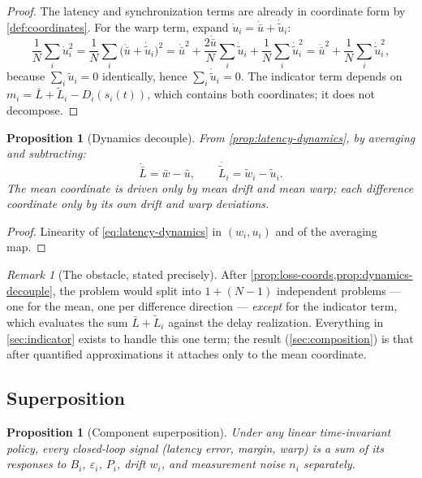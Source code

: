 \documentclass[11pt, a4paper]{article}
\theoremstyle{definition}
\theoremstyle{plain}
\newtheorem{proposition}[theorem]{Proposition}
\theoremstyle{remark}
\newtheorem{remark}{Remark}[section]
\newcommand{\Lbar}{\bar{L}}
\newcommand{\Ltil}[1]{\tilde{L}_{#1}}
\begin{document}
\begin{proof}
The latency and synchronization terms are already in coordinate form by
\cref{def:coordinates}.  For the warp term, expand
$\dot u_i = \dot{\bar u} + \dot{\tilde u}_i$:
\[
  \frac1N\sum_i \dot u_i^2
  = \frac1N\sum_i \bigl(\dot{\bar u} + \dot{\tilde u}_i\bigr)^2
  = \dot{\bar u}^2
    + \frac{2\dot{\bar u}}{N}\sum_i \dot{\tilde u}_i
    + \frac1N\sum_i \dot{\tilde u}_i^2
  = \dot{\bar u}^2 + \frac1N\sum_i \dot{\tilde u}_i^2 ,
\]
because $\sum_i \tilde u_i = 0$ identically, hence
$\sum_i \dot{\tilde u}_i = 0$.  The indicator term depends on
$m_i = \Lbar + \Ltil{i} - D_i(s_i(t))$, which contains both coordinates;
it does not decompose.
\end{proof}

\begin{proposition}[Dynamics decouple]\label{prop:dynamics-decouple}
From \cref{prop:latency-dynamics}, by averaging and subtracting:
\[
  \dot{\Lbar} = \bar w - \bar u ,
  \qquad
  \dot{\Ltil{i}} = \tilde w_i - \tilde u_i .
\]
The mean coordinate is driven only by mean drift and mean warp; each
difference coordinate only by its own drift and warp deviations.
\end{proposition}

\begin{proof}
Linearity of \cref{eq:latency-dynamics} in $(w_i, u_i)$ and of the
averaging map.
\end{proof}

\begin{remark}[The obstacle, stated precisely]\label{rem:obstacle}
After \cref{prop:loss-coords,prop:dynamics-decouple}, the problem would
split into $1 + (N{-}1)$ independent problems --- one for the mean, one
per difference direction --- \emph{except} for the indicator term, which
evaluates the sum $\Lbar + \Ltil{i}$ against the delay realization.
Everything in \cref{sec:indicator} exists to handle this one term; the
result (\cref{sec:composition}) is that after quantified approximations
it attaches only to the mean coordinate.
\end{remark}

\subsection{Superposition}\label{sec:superposition}

\begin{proposition}[Component superposition]\label{prop:superposition}
Under any linear time-invariant policy, every closed-loop signal (latency
error, margin, warp) is a sum of its responses to $B_i$, $\varepsilon_i$,
$P_i$, drift $w_i$, and measurement noise $n_i$ separately.
\end{proposition}
\end{document}
